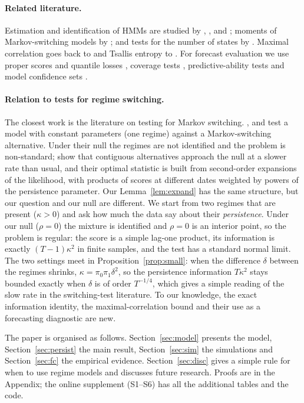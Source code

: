\documentclass[12pt,letterpaper]{article}
\theoremstyle{plain}
\theoremstyle{remark}
\begin{document}
\paragraph{Related literature.} Estimation and identification of HMMs are studied by \citet{ryden1994}, \citet{bickel1998}, \citet{douc2004} and \citet{alexandrovich2016}; moments of Markov-switching models by \citet{timmermann2000}; and tests for the number of states by \citet{dannemann2008}. Maximal correlation goes back to \citet{renyi1959} and Tsallis entropy to \citet{tsallis1988,tsallis2009}. For forecast evaluation we use proper scores and quantile losses \citep{gneiting2007,gneiting2011}, coverage tests \citep{kupiec1995}, predictive-ability tests \citep{diebold1995,giacomini2006} and model confidence sets \citep{hansen2011}.

\paragraph{Relation to tests for regime switching.} The closest work is the literature on testing for Markov switching. \citet{cho2007}, \citet{carrasco2014} and \citet{qu2021} test a model with constant parameters (one regime) against a Markov-switching alternative. Under their null the regimes are not identified and the problem is non-standard; \citet{carrasco2014} show that contiguous alternatives approach the null at a slower rate than usual, and their optimal statistic is built from second-order expansions of the likelihood, with products of scores at different dates weighted by powers of the persistence parameter. Our Lemma~\ref{lem:expand} has the same structure, but our question and our null are different. We start from two regimes that are present ($\kappa>0$) and ask how much the data say about their \emph{persistence}. Under our null ($\rho=0$) the mixture is identified and $\rho=0$ is an interior point, so the problem is regular: the score is a simple lag-one product, its information is exactly $(T-1)\kappa^2$ in finite samples, and the test has a standard normal limit. The two settings meet in Proposition~\ref{prop:small}: when the difference $\delta$ between the regimes shrinks, $\kappa=\pi_0\pi_1\delta^2$, so the persistence information $T\kappa^2$ stays bounded exactly when $\delta$ is of order $T^{-1/4}$, which gives a simple reading of the slow rate in the switching-test literature. To our knowledge, the exact information identity, the maximal-correlation bound and their use as a forecasting diagnostic are new.

The paper is organised as follows. Section~\ref{sec:model} presents the model, Section~\ref{sec:persist} the main result, Section~\ref{sec:sim} the simulations and Section~\ref{sec:fc} the empirical evidence. Section~\ref{sec:disc} gives a simple rule for when to use regime models and discusses future research. Proofs are in the Appendix; the online supplement (S1--S6) has all the additional tables and the code.
\end{document}
